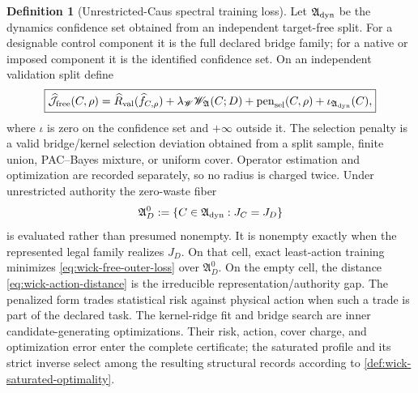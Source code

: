 \documentclass[11pt]{article}
\numberwithin{section}{part}
\theoremstyle{plain}
\theoremstyle{definition}
\newtheorem{definition}[definition]{Definition}
\theoremstyle{remark}
\begin{document}
\begin{definition}[Unrestricted-Caus spectral training loss]
Let \(\mathfrak A_{\rm dyn}\) be the dynamics confidence set obtained from
an independent target-free split.  For a designable control component it is
the full declared bridge family; for a native or imposed component it is the
identified confidence set.  On an independent validation split define
\begin{equation}
 \label{eq:wick-free-outer-loss}
 \boxed{
 \widehat{\mathcal J}_{\rm free}(C,\rho)
 =\widehat R_{\rm val}(\widehat f_{C,\rho})
 +\lambda_{\mathscr W}\mathscr W_{\mathfrak A}(C;D)
 +\operatorname{pen}_{\rm sel}(C,\rho)
 +\iota_{\mathfrak A_{\rm dyn}}(C),
 }
\end{equation}
where \(\iota\) is zero on the confidence set and \(+\infty\) outside it.
The selection penalty is a valid bridge/kernel selection deviation obtained
from a split sample, finite union, PAC--Bayes mixture, or uniform cover.
Operator estimation and optimization are recorded separately, so no radius
is charged twice.  Under
unrestricted authority the zero-waste fiber
\begin{equation}
 \label{eq:wick-zero-waste-fiber}
 \mathfrak A_D^0:=\{C\in\mathfrak A_{\rm dyn}:J_C=J_D\}
\end{equation}
is evaluated rather than presumed nonempty.  It is nonempty exactly when the
represented legal family realizes \(J_D\).  On that cell, exact least-action
training minimizes \eqref{eq:wick-free-outer-loss} over
\(\mathfrak A_D^0\).  On the empty cell, the distance
\eqref{eq:wick-action-distance} is the irreducible representation/authority
gap.  The penalized form trades statistical risk against physical action
when such a trade is part of the declared task.
The kernel-ridge fit and bridge search are inner candidate-generating
optimizations.  Their risk, action, cover charge, and optimization error enter
the complete certificate; the saturated profile and its strict inverse select
among the resulting structural records according to
\cref{def:wick-saturated-optimality}.
\end{definition}
\end{document}
